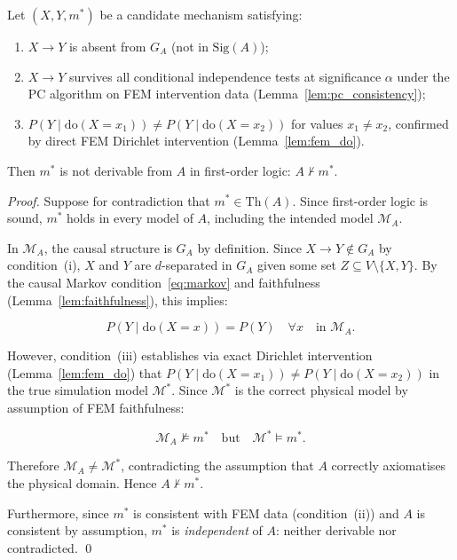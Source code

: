 \documentclass[twoside,11pt]{article}
\newcommand{\doOp}{\mathrm{do}}
\newcommand{\Th}{\mathrm{Th}}
\newcommand{\Sig}{\mathrm{Sig}}
\begin{document}
\begin{theorem}
\label{thm:causal_lifting}
Let $(X, Y, m^*)$ be a candidate mechanism satisfying:
\begin{enumerate}[label=(\roman*)]
  \item $X \to Y$ is absent from $G_A$ (not in $\Sig(A)$);
  \item $X \to Y$ survives all conditional independence tests at
    significance $\alpha$ under the PC algorithm on FEM intervention
    data (Lemma~\ref{lem:pc_consistency});
  \item $P(Y \mid \doOp(X{=}x_1)) \neq P(Y \mid \doOp(X{=}x_2))$
    for values $x_1 \neq x_2$, confirmed by direct FEM Dirichlet
    intervention (Lemma~\ref{lem:fem_do}).
\end{enumerate}
Then $m^*$ is not derivable from $A$ in first-order logic:
$A \nvdash m^*$.
\end{theorem}

\begin{proof}
Suppose for contradiction that $m^* \in \Th(A)$. Since first-order
logic is sound, $m^*$ holds in every model of $A$, including the
intended model $\mathcal{M}_A$.

In $\mathcal{M}_A$, the causal structure is $G_A$ by definition.
Since $X \to Y \notin G_A$ by condition~(i), $X$ and $Y$ are
$d$-separated in $G_A$ given some set $Z \subseteq V \setminus
\{X, Y\}$. By the causal Markov condition~\eqref{eq:markov} and
faithfulness (Lemma~\ref{lem:faithfulness}), this implies:

\begin{equation}
  P(Y \mid \doOp(X{=}x)) = P(Y) \quad \forall x
  \quad \text{in } \mathcal{M}_A.
  \label{eq:no_effect}
\end{equation}

However, condition~(iii) establishes via exact Dirichlet intervention
(Lemma~\ref{lem:fem_do}) that
$P(Y \mid \doOp(X{=}x_1)) \neq P(Y \mid \doOp(X{=}x_2))$
in the true simulation model $\mathcal{M}^*$. Since
$\mathcal{M}^*$ is the correct physical model by assumption of
FEM faithfulness:

\begin{equation}
  \mathcal{M}_A \not\models m^*
  \quad \text{but} \quad
  \mathcal{M}^* \models m^*.
  \label{eq:contradiction}
\end{equation}

Therefore $\mathcal{M}_A \neq \mathcal{M}^*$, contradicting the
assumption that $A$ correctly axiomatises the physical domain.
Hence $A \nvdash m^*$.

Furthermore, since $m^*$ is consistent with FEM data (condition~(ii))
and $A$ is consistent by assumption, $m^*$ is \emph{independent} of
$A$: neither derivable nor contradicted. \qed
\end{proof}
\end{document}
